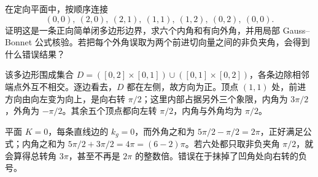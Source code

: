 \begin{exercise}
	\label{g1:ex:concave-boundary-angles}
	在定向平面中，按顺序连接
	\[
		(0,0),\ (2,0),\ (2,1),\ (1,1),\ (1,2),\ (0,2),\ (0,0).
	\]
	证明这是一条正向简单闭多边形边界，求六个内角和有向外角，并用局部 Gauss–Bonnet 公式核验。若把每个外角误取为两个前进切向量之间的非负夹角，会得到什么错误结果？
\end{exercise}
\begin{solution}
	该多边形围成集合 \(D=([0,2]\times[0,1])\cup([0,1]\times[0,2])\)，各条边除相邻端点外互不相交。逐边看去，\(D\) 都在左侧，故方向为正。顶点 \((1,1)\) 处，前进方向由向左变为向上，是向右转 \(\pi/2\)；这里内部占据另外三个象限，内角为 \(3\pi/2\)，外角为 \(-\pi/2\)。其余五个顶点都向左转 \(\pi/2\)，内角与外角均为 \(\pi/2\)。

	平面 \(K=0\)，每条直线边的 \(k_g=0\)，而外角之和为 \(5\pi/2-\pi/2=2\pi\)，正好满足公式；内角之和为 \(5\pi/2+3\pi/2=4\pi=(6-2)\pi\)。若六处都只取非负夹角 \(\pi/2\)，就会算得总转角 \(3\pi\)，甚至不再是 \(2\pi\) 的整数倍。错误在于抹掉了凹角处向右转的负号。
\end{solution}

